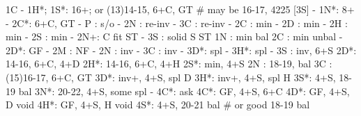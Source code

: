 1C - 1H*;
1S*: 16+; or (13)14-15, 6+C, GT  # may be 16-17, 4225 [3S]
   - 1N*: 8+
        - 2C*: 6+C, GT
             - P  : s/o
             - 2N : re-inv
             - 3C : re-inv
   - 2C : min
   - 2D : min
   - 2H : min
   - 2S : min 
   - 2N+: C fit ST
   - 3S : solid S ST
1N : min bal
2C : min unbal
   - 2D*: GF
   - 2M : NF
   - 2N : inv
   - 3C : inv
   - 3D*: spl
   - 3H*: spl
   - 3S : inv, 6+S
2D*: 14-16, 6+C, 4+D
2H*: 14-16, 6+C, 4+H 
2S*: min, 4+S
2N : 18-19, bal
3C : (15)16-17, 6+C, GT
3D*: inv+, 4+S, spl D
3H*: inv+, 4+S, spl H
3S*: 4+S, 18-19 bal
3N*: 20-22, 4+S, some spl
   - 4C*: ask
4C*: GF, 4+S, 6+C
4D*: GF, 4+S, D void 
4H*: GF, 4+S, H void 
4S*: 4+S, 20-21 bal  # or good 18-19 bal
